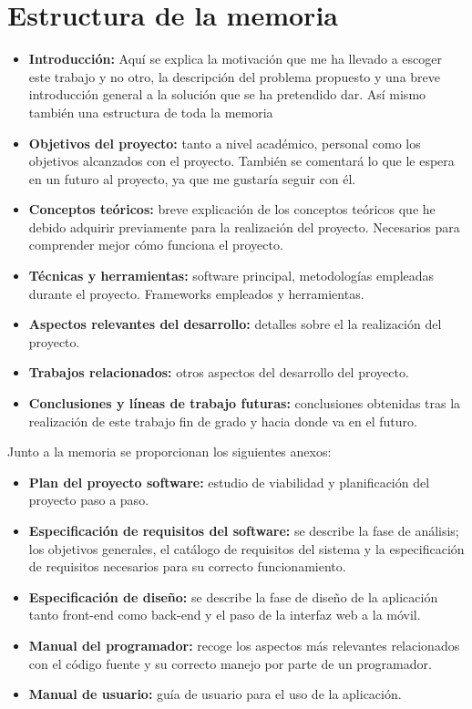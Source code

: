 \section{Estructura de la memoria}\label{estructura-de-la-memoria}

\begin{itemize}
\tightlist
\item
  \textbf{Introducción:} Aquí se explica la motivación que me ha llevado a escoger este trabajo y no otro, la descripción del problema propuesto y una breve introducción general a la solución que se ha pretendido dar. Así mismo también una estructura de toda la memoria 
\item
  \textbf{Objetivos del proyecto:} tanto a nivel académico, personal como los objetivos alcanzados con el proyecto. También se comentará lo que le espera en un futuro al proyecto, ya que me gustaría seguir con él.
\item
  \textbf{Conceptos teóricos:} breve explicación de los conceptos
  teóricos que he debido adquirir previamente para la realización del proyecto. Necesarios para comprender mejor cómo funciona el proyecto.
\item
  \textbf{Técnicas y herramientas:} software principal, metodologías empleadas durante el proyecto. Frameworks empleados y herramientas.
\item
  \textbf{Aspectos relevantes del desarrollo:} detalles sobre el la realización del proyecto.
\item
  \textbf{Trabajos relacionados:} otros aspectos del desarrollo del proyecto.
\item
  \textbf{Conclusiones y líneas de trabajo futuras:} conclusiones
  obtenidas tras la realización de este trabajo fin de grado y hacia donde va en el futuro.
\end{itemize}

Junto a la memoria se proporcionan los siguientes anexos:

\begin{itemize}
\tightlist
\item
  \textbf{Plan del proyecto software:} estudio de viabilidad y planificación del proyecto paso a paso.
\item
  \textbf{Especificación de requisitos del software:} se describe la
  fase de análisis; los objetivos generales, el catálogo de requisitos
  del sistema y la especificación de requisitos necesarios para su correcto funcionamiento.
\item
  \textbf{Especificación de diseño:} se describe la fase de diseño de la aplicación tanto front-end como back-end y el paso de la interfaz web a la móvil.
\item
  \textbf{Manual del programador:} recoge los aspectos más relevantes
  relacionados con el código fuente y su correcto manejo por parte de un programador.
\item
  \textbf{Manual de usuario:} guía de usuario para el uso de la aplicación.
\end{itemize}

